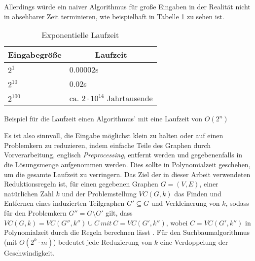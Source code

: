  Allerdings würde ein naiver Algorithmus für große Eingaben in der Realität nicht in absehbarer Zeit terminieren, wie beispielhaft in Tabelle \ref{tab:exponential} zu sehen ist.
 \begin{table}[htb]
\caption{Exponentielle Laufzeit \label{tab:exponential}}
\vspace*{1em}
\centering

\bgroup
\def\arraystretch{1.3}%

\begin{threeparttable}

\begin{tabular}[c]{l l}
	\hline
	\multicolumn{1}{c}{\textbf{Eingabegröße}} & 
	\multicolumn{1}{c}{\textbf{Laufzeit}} \\ 
	
	\hline

	$2^{1}$& 0.00002s\\
	$2^{10}$& 0.02s\\
	$2^{100}$& ca. $ 2 \cdot 10^{14} $ Jahrtausende \\
	\hline
\end{tabular}

\begin{tablenotes}\footnotesize
\item Beispiel für die Laufzeit einen Algorithmus' mit eine Laufzeit von $O(2^{n})$
\end{tablenotes}

\end{threeparttable}

\egroup

\end{table}
Es ist also sinnvoll, die Eingabe möglichst klein zu halten oder auf einen Problemkern zu reduzieren, indem einfache Teile des Graphen durch Vorverarbeitung, englisch \emph{Preprocessing}, entfernt werden und gegebenenfalls in die Lösungsmenge aufgenommen werden. Dies sollte in Polynomialzeit geschehen, um die gesamte Laufzeit zu verringern. Das Ziel der in dieser Arbeit verwendeten Reduktionsregeln ist, für einen gegebenen Graphen $G=(V,E)$, einer natürlichen Zahl $k$ und der Problemstellung $VC(G,k)$ das Finden und Entfernen eines induzierten Teilgraphen $G' \subseteq G$ und Verkleinerung von $k$,
sodass für den Problemkern $G'' = G \setminus G'$ gilt, dass $VC(G,k) = VC(G'',k'') \cup C\ mit\ C=VC(G', k'')$, wobei $C=VC(G', k'')$ in Polynomialzeit durch die Regeln berechnen lässt \cite{fundamentals}. Für den Suchbaumalgorithmus (mit $O(2^{k} \cdot m)$) bedeutet jede Reduzierung von $k$ eine Verdoppelung der Geschwindigkeit. 


